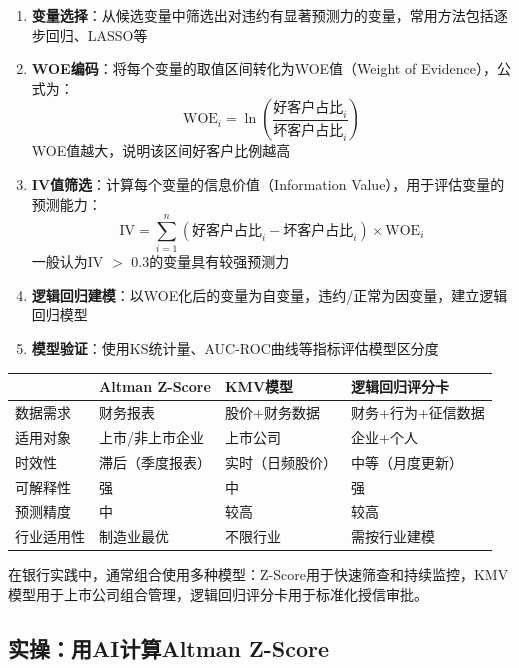 \begin{enumerate}[leftmargin=2em]
  \item \textbf{变量选择}：从候选变量中筛选出对违约有显著预测力的变量，常用方法包括逐步回归、LASSO等
  \item \textbf{WOE编码}：将每个变量的取值区间转化为WOE值（Weight of Evidence），公式为：
  \[
  \text{WOE}_i = \ln\left(\frac{\text{好客户占比}_i}{\text{坏客户占比}_i}\right)
  \]
  WOE值越大，说明该区间好客户比例越高
  \item \textbf{IV值筛选}：计算每个变量的信息价值（Information Value），用于评估变量的预测能力：
  \[
  \text{IV} = \sum_{i=1}^{n} (\text{好客户占比}_i - \text{坏客户占比}_i) \times \text{WOE}_i
  \]
  一般认为IV $>$ 0.3的变量具有较强预测力
  \item \textbf{逻辑回归建模}：以WOE化后的变量为自变量，违约/正常为因变量，建立逻辑回归模型
  \item \textbf{模型验证}：使用KS统计量、AUC-ROC曲线等指标评估模型区分度
\end{enumerate}

\begin{theorybox}[三种信用风险模型的适用场景对比]
\begin{tabular}[t]{lp{3.5cm}p{3.5cm}p{3.5cm}}
  & \textbf{Altman Z-Score} & \textbf{KMV模型} & \textbf{逻辑回归评分卡} \\
\midrule
数据需求 & 财务报表 & 股价+财务数据 & 财务+行为+征信数据 \\
适用对象 & 上市/非上市企业 & 上市公司 & 企业+个人 \\
时效性 & 滞后（季度报表） & 实时（日频股价） & 中等（月度更新） \\
可解释性 & 强 & 中 & 强 \\
预测精度 & 中 & 较高 & 较高 \\
行业适用性 & 制造业最优 & 不限行业 & 需按行业建模 \\
\end{tabular}

\vspace{0.5em}
在银行实践中，通常组合使用多种模型：Z-Score用于快速筛查和持续监控，KMV模型用于上市公司组合管理，逻辑回归评分卡用于标准化授信审批。
\end{theorybox}

\subsection{实操：用AI计算Altman Z-Score}

